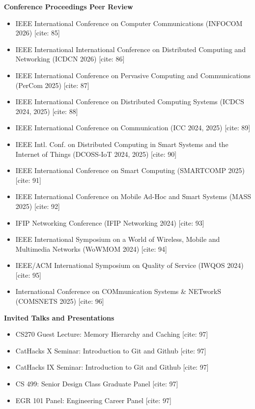 \documentclass[a4paper,12pt]{article}
\begin{document}
\textbf{Conference Proceedings Peer Review}
\begin{itemize}[nosep,after=\strut, leftmargin=1em, itemsep=3pt,label=--]
\item IEEE International Conference on Computer Communications (INFOCOM 2026) [cite: 85]
\item IEEE International International Conference on Distributed Computing and Networking (ICDCN 2026) [cite: 86]
\item IEEE International Conference on Pervasive Computing and Communications (PerCom 2025) [cite: 87]
\item IEEE International Conference on Distributed Computing Systems (ICDCS 2024, 2025) [cite: 88]
\item IEEE International Conference on Communication (ICC 2024, 2025) [cite: 89]
\item IEEE Intl. Conf. on Distributed Computing in Smart Systems and the Internet of Things (DCOSS-IoT 2024, 2025) [cite: 90]
\item IEEE International Conference on Smart Computing (SMARTCOMP 2025) [cite: 91]
\item IEEE International Conference on Mobile Ad-Hoc and Smart Systems (MASS 2025) [cite: 92]
\item IFIP Networking Conference (IFIP Networking 2024) [cite: 93]
\item IEEE International Symposium on a World of Wireless, Mobile and Multimedia Networks (WoWMOM 2024) [cite: 94]
\item IEEE/ACM International Symposium on Quality of Service (IWQOS 2024) [cite: 95]
\item International Conference on COMmunication Systems \& NETworkS (COMSNETS 2025) [cite: 96]
\end{itemize}

\textbf{Invited Talks and Presentations}
\begin{itemize}[nosep,after=\strut, leftmargin=1em, itemsep=3pt,label=--]
\item CS270 Guest Lecture: Memory Hierarchy and Caching [cite: 97]
\item CatHacks X Seminar: Introduction to Git and Github [cite: 97]
\item CatHacks IX Seminar: Introduction to Git and Github [cite: 97]
\item CS 499: Senior Design Class Graduate Panel [cite: 97]
\item EGR 101 Panel: Engineering Career Panel [cite: 97]
\end{itemize}
\end{document}
